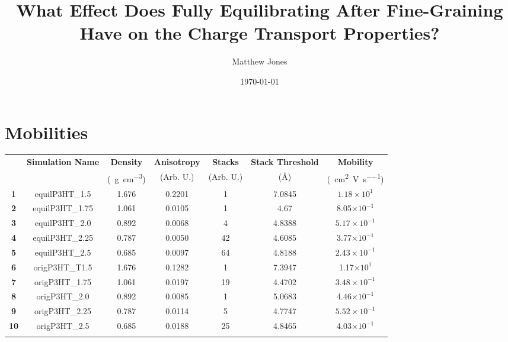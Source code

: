 \documentclass[12pt]{article}
\title{What Effect Does Fully Equilibrating After Fine-Graining Have on the Charge Transport Properties?}
\author{Matthew Jones}
\date{\today}
\def\mobunits{\square\centi\meter\per\volt\per\second}
\def\gcm{\gram\per\cubic\centi\meter}
\def\ccg{\cellcolor{gray}}
\begin{document}
\maketitle


\section{Mobilities}

\begin{center}
\begin{adjustbox}{max width = \textwidth}
\begin{tabular}{| c | c | c | c | c | c | c |}
\hline
\rule{0pt}{2.5ex} 
\multirow{2}{*}{\textbf{ID}}&\multirow{2}{*}{\textbf{Simulation Name}}&\textbf{Density}&\textbf{Anisotropy}&\textbf{Stacks}&\textbf{Stack Threshold}&\textbf{Mobility}\\
                            &&(\SI{}{\gcm})&(Arb. U.)&(Arb. U.)&(\AA)&(\SI{}{\mobunits})\\
\hhline{|=======|}
\textbf{1}&\rule{0pt}{2.5ex}equilP3HT\_1.5&1.676&0.2201&1&7.0845&$1.18\times 10^{1}$\\
\textbf{\ccg2}&\rule{0pt}{2.5ex}{\ccg}equilP3HT\_1.75&\ccg1.061&\ccg0.0105&\ccg1&\ccg4.67&\ccg8.05$\times 10^{-1}$\\
\textbf{3}&\rule{0pt}{2.5ex}equilP3HT\_2.0&0.892&0.0068&4&4.8388&$5.17\times 10^{-1}$\\
\textbf{\ccg4}&\rule{0pt}{2.5ex}{\ccg}equilP3HT\_2.25&\ccg0.787&\ccg0.0050&\ccg42&\ccg4.6085&\ccg3.77$\times 10^{-1}$\\
\textbf{5}&\rule{0pt}{2.5ex}equilP3HT\_2.5&0.685&0.0097&64&4.8188&$2.43\times 10^{-1}$\\
\hhline{|=======|}
\textbf{\ccg6}&\rule{0pt}{2.5ex}{\ccg}origP3HT\_T1.5&\ccg1.676&\ccg0.1282&\ccg1&\ccg7.3947&\ccg1.17$\times 10^{1}$\\
\textbf{7}&\rule{0pt}{2.5ex}origP3HT\_1.75&1.061&0.0197&19&4.4702&$3.48\times 10^{-1}$\\
\textbf{\ccg8}&\rule{0pt}{2.5ex}{\ccg}origP3HT\_2.0&\ccg0.892&\ccg0.0085&\ccg1&\ccg5.0683&\ccg4.46$\times 10^{-1}$\\
\textbf{9}&\rule{0pt}{2.5ex}origP3HT\_2.25&0.787&0.0114&5&4.7747&$5.52\times 10^{-1}$\\
\textbf{\ccg10}&\rule{0pt}{2.5ex}{\ccg}origP3HT\_2.5&\ccg0.685&\ccg0.0188&\ccg25&\ccg4.8465&\ccg4.03$\times 10^{-1}$\\
\hhline{-------}
\end{tabular}\label{table:mob}
\end{adjustbox}
\end{center}
\end{document}
